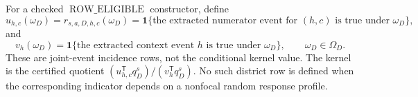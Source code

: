 For a checked \(\operatorname{ROW\_ELIGIBLE}\) constructor, define
\[
u_{h,c}(\omega_D)=r_{s,a,D,h,c}(\omega_D)
=\mathbf 1\{\text{the extracted numerator event for }(h,c)\text{ is true under }\omega_D\},
\]
and
\[
v_h(\omega_D)
=\mathbf 1\{\text{the extracted context event }h\text{ is true under }\omega_D\},
\qquad \omega_D\in\Omega_D.
\]
These are joint-event incidence rows, not the conditional kernel value.  The kernel is the certified quotient \((u_{h,c}^{\mathsf T}q_D^s)/(v_h^{\mathsf T}q_D^s)\).  No such district row is defined when the corresponding indicator depends on a nonfocal random response profile.